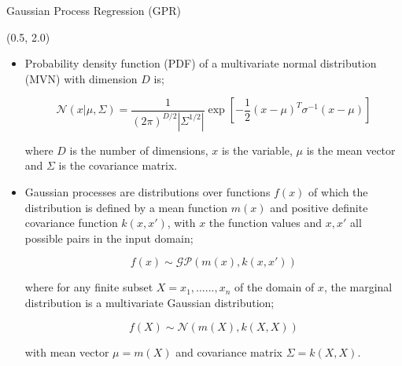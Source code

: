 \documentclass[10pt, xcolor={dvipsnames}, aspectratio = 169]{beamer}
\begin{document}
\begin{frame}[fragile]{Gaussian Process Regression (GPR)}

\begin{textblock}{14.0}(0.5, 2.0)

\begin{itemize}

\item Probability density function (PDF) of a multivariate normal distribution (MVN) with dimension $D$ is;

\begin{equation*}
\mathcal{N} (x| \mu, \Sigma) = \frac{1}{(2\pi)^{D/2} |\Sigma^{1/2}|} \exp\left[ -\frac{1}{2}(x - \mu)^{T}\sigma^{-1}(x - \mu)\right]
\end{equation*}

where $D$ is the number of dimensions, $x$ is the variable, $\mu$ is the mean vector and $\Sigma$ is the covariance matrix.

\item Gaussian processes are distributions over functions $f(x)$ of which the distribution is defined by a mean function
$m(x)$ and positive definite covariance function $k(x, x')$, with $x$ the function values and $x, x'$ all possible pairs
in the input domain;

\begin{equation*}
    f(x) \sim \mathcal{G}\mathcal{P}(m(x), k(x, x'))
\end{equation*}

where for any finite subset $X = {x_{1}, ......, x_{n}}$ of the domain of $x$, the marginal distribution is a
multivariate Gaussian distribution;

\begin{equation*}
f(X) \sim \mathcal{N}(m(X), k(X, X))
\end{equation*}

with mean vector $\mu = m(X)$ and covariance matrix $\Sigma = k(X, X)$.

\end{itemize}

\end{textblock}

\end{frame}
\end{document}
